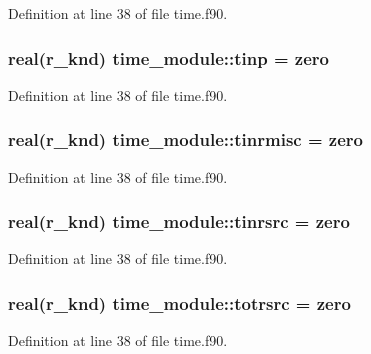 Definition at line 38 of file time.\-f90.

\hypertarget{classtime__module_a4d112ccfe86d8ab7b0a2c04b98078db3}{
\subsubsection[{tinp}]{\setlength{\rightskip}{0pt plus 5cm}real(r\-\_\-knd) time\-\_\-module\-::tinp = zero}}\label{classtime__module_a4d112ccfe86d8ab7b0a2c04b98078db3}


Definition at line 38 of file time.\-f90.

\hypertarget{classtime__module_a548875e460521a98bdde436c107d5da0}{
\subsubsection[{tinrmisc}]{\setlength{\rightskip}{0pt plus 5cm}real(r\-\_\-knd) time\-\_\-module\-::tinrmisc = zero}}\label{classtime__module_a548875e460521a98bdde436c107d5da0}


Definition at line 38 of file time.\-f90.

\hypertarget{classtime__module_a384b45af0c322ff75699b051ec3a96ec}{
\subsubsection[{tinrsrc}]{\setlength{\rightskip}{0pt plus 5cm}real(r\-\_\-knd) time\-\_\-module\-::tinrsrc = zero}}\label{classtime__module_a384b45af0c322ff75699b051ec3a96ec}


Definition at line 38 of file time.\-f90.

\hypertarget{classtime__module_a309311ea73088ac5662d6acaf1aca614}{
\subsubsection[{totrsrc}]{\setlength{\rightskip}{0pt plus 5cm}real(r\-\_\-knd) time\-\_\-module\-::totrsrc = zero}}\label{classtime__module_a309311ea73088ac5662d6acaf1aca614}


Definition at line 38 of file time.\-f90.


